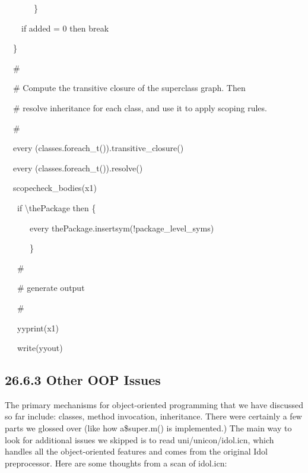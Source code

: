 {\ttfamily\mdseries
\ \ \ \ \ \ \ \}}

{\ttfamily\mdseries
\ \ \ \ if added = 0 then break}

{\ttfamily\mdseries
\ \ \}}

{\ttfamily\mdseries
\ \ \#}

{\ttfamily\mdseries
\ \ \# Compute the transitive closure of the superclass graph. Then}

{\ttfamily\mdseries
\ \ \# resolve inheritance for each class, and use it to apply scoping rules.}

{\ttfamily\mdseries
\ \ \#}

{\ttfamily\mdseries
\ \ every (classes.foreach\_t()).transitive\_closure()}

{\ttfamily\mdseries
\ \ every (classes.foreach\_t()).resolve()}


\bigskip

{\ttfamily\mdseries
\ \ scopecheck\_bodies(x1)}


\bigskip

{\ttfamily\mdseries
\ \ \ if {\textbackslash}thePackage then \{}

{\ttfamily\mdseries
\ \ \ \ \ \ every thePackage.insertsym(!package\_level\_syms)}

{\ttfamily\mdseries
\ \ \ \ \ \ \}}


\bigskip

{\ttfamily\mdseries
\ \ \ \#}

{\ttfamily\mdseries
\ \ \ \# generate output}

{\ttfamily\mdseries
\ \ \ \#}

{\ttfamily\mdseries
\ \ \ yyprint(x1)}

{\ttfamily\mdseries
\ \ \ write(yyout)}

\subsection[26.6.3 Other OOP Issues]{26.6.3 Other OOP Issues}

The primary mechanisms for object-oriented programming that we have
discussed so far include: classes, method invocation,
inheritance. There were certainly a few parts we glossed over (like
how a\$super.m() is implemented.) The main way to look for additional
issues we skipped is to read uni/unicon/idol.icn, which handles all
the object-oriented features and comes from the original Idol
preprocessor. Here are some thoughts from a scan of idol.icn:


